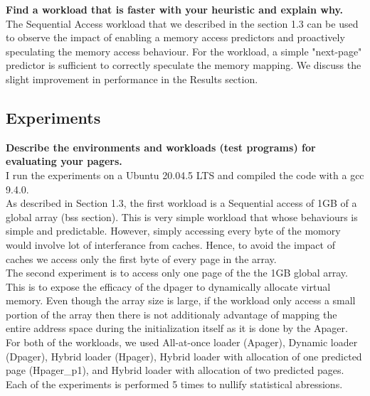 \documentclass{article}
\begin{document}
\textbf{Find a workload that is faster with your heuristic and explain why.}\\

The Sequential Access workload that we described in the section 1.3 can be used to observe the impact of
enabling a memory access predictors and proactively speculating the memory access behaviour. For the 
workload, a simple "next-page" predictor is sufficient to correctly speculate the memory mapping. We 
discuss the slight improvement in performance in the Results section. 

\subsection{Experiments}

\textbf{Describe the environments and workloads (test programs) for evaluating your pagers.}\\

    I run the experiments on a Ubuntu 20.04.5 LTS and compiled the code with a gcc 9.4.0.\\
    
    As described in Section 1.3, the first workload is a Sequential access of 1GB of a global array 
    (bss section). This is very simple workload that whose behaviours is simple and predictable. 
    However, simply accessing every byte of the momory would involve lot of interferance from caches. 
    Hence, to avoid the impact of caches we access only the first byte of every page in the array. \\

    The second experiment is to access only one page of the the 1GB global array. This is to expose the 
    efficacy of the dpager to dynamically allocate virtual memory. Even though the array size is large, if 
    the workload only access a small portion of the array then there is not additionaly advantage of mapping
    the entire address space during the initialization itself as it is done by the Apager.\\ 

    For both of the workloads, we used All-at-once loader (Apager), Dynamic loader (Dpager), 
    Hybrid loader (Hpager), Hybrid loader with allocation of one predicted page (Hpager\_p1), and Hybrid loader
    with allocation of two predicted pages.\\

    Each of the experiments is performed 5 times to nullify statistical abressions.\\
\end{document}
